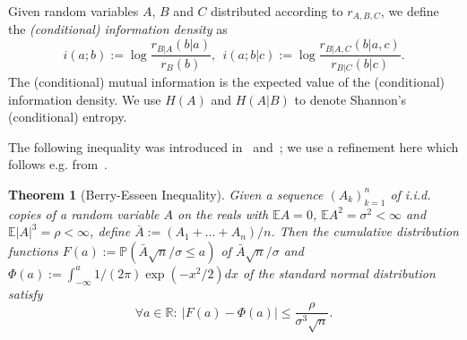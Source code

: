 \documentclass[journal]{IEEEtran}
\newcommand{\generalpmf}{r}
\newcommand{\generalrvOne}{A}
\newcommand{\generalrvOneValue}{a}
\newcommand{\generalrvTwo}{B}
\newcommand{\generalrvTwoValue}{b}
\newcommand{\generalrvThree}{C}
\newcommand{\generalrvThreeValue}{c}
\newcommand{\generalSecondMoment}{\sigma}
\newcommand{\generalThirdMoment}{\rho}
\newcommand{\generalcdf}{F}
\newcommand{\generalintegrand}{x}
\newcommand{\generalSummationIndex}{k}
\newcommand{\generalSummationBound}{n}
\newcommand{\entropy}[1]{H(#1)}
\newcommand{\entropyConditional}[2]{H(#1 | #2)}
\newcommand{\absolute}[1]{\left\lvert #1 \right\rvert}
\newcommand{\informationDensity}[2]{i({#1};{#2})}
\newcommand{\informationDensityConditional}[3]{i({#1};{#2} | {#3})}
\newcommand{\Expectation}{\mathbb{E}}
\newcommand{\Probability}{\mathbb{P}}
\newcommand{\normalcdf}{\Phi}
\newcommand{\reals}{\mathbb{R}}
\newtheorem{theorem}{Theorem}
\begin{document}
Given random variables $\generalrvOne$, $\generalrvTwo$ and $\generalrvThree$ distributed according to $\generalpmf_{\generalrvOne, \generalrvTwo, \generalrvThree}$, we define the \emph{(conditional) information density} as
\[
\informationDensity{\generalrvOneValue}{\generalrvTwoValue} := \log \frac{\generalpmf_{\generalrvTwo | \generalrvOne}(\generalrvTwoValue | \generalrvOneValue)}{\generalpmf_{\generalrvTwo}(\generalrvTwoValue)}
,~~
\informationDensityConditional{\generalrvOneValue}{\generalrvTwoValue}{\generalrvThreeValue} := \log \frac{\generalpmf_{\generalrvTwo | \generalrvOne, \generalrvThree}(\generalrvTwoValue | \generalrvOneValue, \generalrvThreeValue)}{\generalpmf_{\generalrvTwo | \generalrvThree}(\generalrvTwoValue | \generalrvThreeValue)}.
\]
The (conditional) mutual information is the expected value of the (conditional) information density. We use $\entropy{\generalrvOne}$ and $\entropyConditional{\generalrvOne}{\generalrvTwo}$ to denote Shannon's (conditional) entropy.

The following inequality was introduced in~\cite{Berry} and~\cite{Esseen}; we use a refinement here which follows e.g. from~\cite{BeekBerryEsseen}.
\begin{theorem}[Berry-Esseen Inequality]
\label{theorem:berry-esseen}
Given a sequence $(\generalrvOne_\generalSummationIndex)_{\generalSummationIndex=1}^{\generalSummationBound}$ of i.i.d. copies of a random variable $\generalrvOne$ on the reals with $\Expectation \generalrvOne = 0$, $\Expectation \generalrvOne^2 = \generalSecondMoment^2 < \infty$ and $\Expectation \absolute{\generalrvOne}^3 = \generalThirdMoment < \infty$, define $\bar{\generalrvOne} := (\generalrvOne_1 + \dots + \generalrvOne_\generalSummationBound)/\generalSummationBound$. Then the cumulative distribution functions $\generalcdf(\generalrvOneValue) := \Probability(\bar{\generalrvOne}\sqrt{\generalSummationBound}/\generalSecondMoment \leq \generalrvOneValue)$ of $\bar{\generalrvOne}\sqrt{\generalSummationBound}/\generalSecondMoment$ and $\normalcdf(\generalrvOneValue) := \int_{-\infty}^\generalrvOneValue 1/(2\pi) \exp(-\generalintegrand^2/2)  d \generalintegrand$ of the standard normal distribution satisfy
\[
\forall \generalrvOneValue \in \reals:~
\absolute{\generalcdf(\generalrvOneValue) - \normalcdf(\generalrvOneValue)}
\leq
\frac{\generalThirdMoment}
     {\generalSecondMoment^3 \sqrt{\generalSummationBound}}.
\]
\end{theorem}
\end{document}
